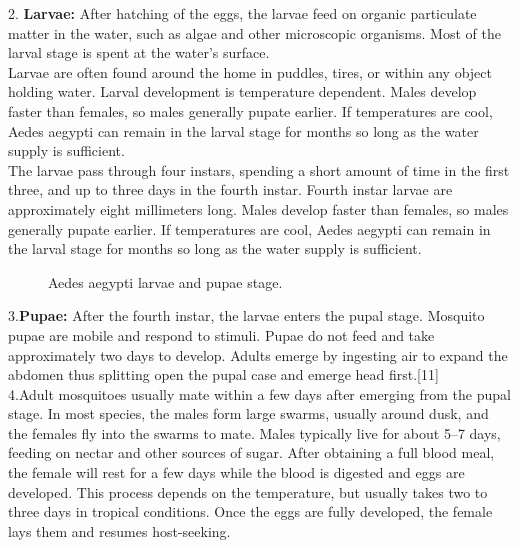 \documentclass[11pt]{exam}
\begin{document}
\begin{questions}
2. \textbf{Larvae:} After hatching of the eggs, the larvae feed on organic particulate matter in the water, such as algae and other microscopic organisms. Most of the larval stage is spent at the water's surface.\\ %
Larvae are often found around the home in puddles, tires, or within any object holding water. Larval development is temperature dependent. Males develop faster than females, so males generally pupate earlier. If temperatures are cool, Aedes aegypti can remain in the larval stage for months so long as the water supply is sufficient. \\  The larvae pass through four instars, spending a short amount of time in the first three, and up to three days in the fourth instar. Fourth instar larvae are approximately eight millimeters long. 
Males develop faster than females, so males generally pupate earlier. If temperatures are cool, Aedes aegypti can remain in the larval stage for months so long as the water supply is sufficient.\\ 
\begin{figure}[H]
  \centering
    \hfill
  \caption{Aedes aegypti larvae and pupae stage.}
  \label{Ae.Aegypti life stages.}    
\end{figure} 

3.\textbf{Pupae:} After the fourth instar, the larvae enters the pupal stage. Mosquito pupae are mobile and respond to stimuli. Pupae do not feed and take approximately two days to develop. Adults emerge by ingesting air to expand the abdomen thus splitting open the pupal case and emerge head first.[11]\\

4.Adult mosquitoes usually mate within a few days after emerging from the pupal stage. In most species, the males form large swarms, usually around dusk, and the females fly into the swarms to mate. Males typically live for about 5–7 days, feeding on nectar and other sources of sugar. After obtaining a full blood meal, the female will rest for a few days while the blood is digested and eggs are developed. This process depends on the temperature, but usually takes two to three days in tropical conditions. Once the eggs are fully developed, the female lays them and resumes host-seeking. \\


\end{questions}
\end{document}
